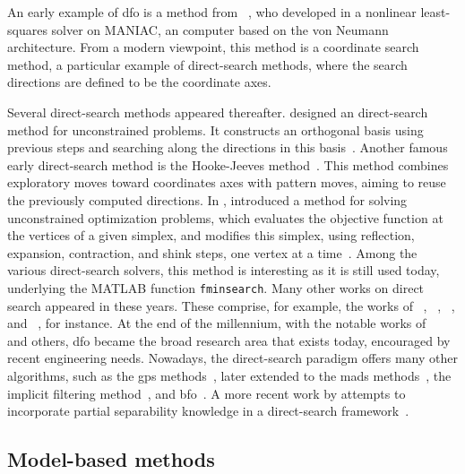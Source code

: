 An early example of \gls{dfo} is a method from \citeauthor{Fermi_Metropolis_1952}~\cite{Fermi_Metropolis_1952}, who developed in \citeyear{Fermi_Metropolis_1952} a nonlinear least-squares solver on MANIAC, an computer based on the von Neumann architecture.
From a modern viewpoint, this method is a coordinate search method, a particular example of direct-search methods, where the search directions are defined to be the coordinate axes.

Several direct-search methods appeared thereafter.
\citeauthor{Rosenbrock_1960} designed an direct-search method for unconstrained problems.
It constructs an orthogonal basis using previous steps and searching along the directions in this basis~\cite{Rosenbrock_1960}.
Another famous early direct-search method is the Hooke-Jeeves method~\cite{Hooke_Jeeves_1961}.
This method combines exploratory moves toward coordinates axes with pattern moves, aiming to reuse the previously computed directions.
In \citeyear{Nelder_Mead_1965}, \citeauthor{Nelder_Mead_1965} introduced a method for solving unconstrained optimization problems, which evaluates the objective function at the vertices of a given simplex, and modifies this simplex, using reflection, expansion, contraction, and shink steps, one vertex at a time~\cite{Nelder_Mead_1965}.
Among the various direct-search solvers, this method is interesting as it is still used today, underlying the MATLAB function \verb|fminsearch|.
Many other works on direct search appeared in these years.
These comprise, for example, the works of \citeauthor{Powell_1964}~\cite{Powell_1964,Powell_1975a}, \citeauthor{Matyas_1965}~\cite{Matyas_1965}, \citeauthor{Fletcher_1965}~\cite{Fletcher_1965}, and \citeauthor{Box_1966}~\cite{Box_1966}, for instance.
At the end of the millennium, with the notable works of \citeauthor{Wright_1995}~\cite{Wright_1995} and others, \gls{dfo} became the broad research area that exists today, encouraged by recent engineering needs.
Nowadays, the direct-search paradigm offers many other algorithms, such as the \gls{gps} methods~\cite{Booker_Etal_1999}, later extended to the \gls{mads} methods~\cite{Abramson_Audet_2006,Abramson_Etal_2009,Audet_Dennis_2006,Audet_Dennis_Digabel_2008,Digabel_2011}, the implicit filtering method~\cite{Kelley_2011}, and \gls{bfo}~\cite{Porcelli_Toint_2017}.
A more recent work by \citeauthor{Porcelli_Toint_2022} attempts to incorporate partial separability knowledge in a direct-search framework~\cite{Porcelli_Toint_2022}.

\subsection{Model-based methods}

